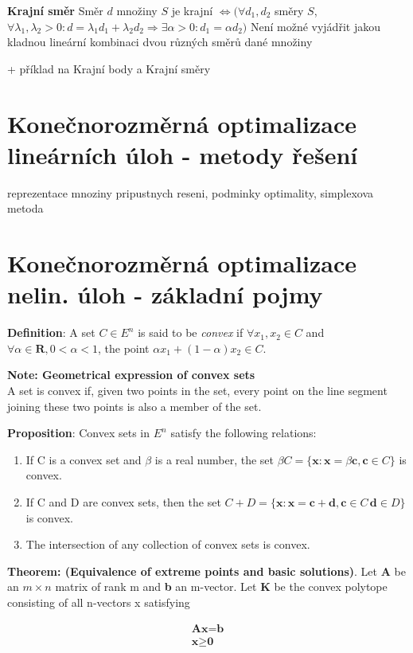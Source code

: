 \textbf{Krajní směr}
Směr $d$ množiny $S$ je krajní $\Leftrightarrow (\forall d_{1},d_{2} $ směry $S$,$ \forall \lambda _{1},\lambda _{2}> 0:d=\lambda _{1}d_{1}+\lambda_{2}d_{2}\Rightarrow \exists \alpha > 0:d_{1}=\alpha d_{2})$
\newline Není možné vyjádřit jakou kladnou lineární kombinaci dvou různých směrů dané množiny


+ příklad na Krajní body a Krajní směry 

\section{Konečnorozměrná optimalizace lineárních úloh - metody řešení}
reprezentace mnoziny pripustnych reseni, podminky optimality, simplexova metoda

\section{Konečnorozměrná optimalizace nelin. úloh - základní pojmy}
\textbf{Definition}: A set $C \in E^{n}$ is said to be \textit{convex} if $\forall x_{1},x_{2} \in C$ and $\forall \alpha \in \mathbf{R}, 0 < \alpha  < 1$, the point $\alpha x_{1} + (1 - \alpha) x_{2} \in C$.

\textbf{Note: Geometrical expression of convex sets} \\
A set is convex if, given two points in the set, every point on the line segment joining these two
points is also a member of the set.

\textbf{Proposition}: Convex sets in $E^{n}$ satisfy the following relations:
\begin{enumerate}
\item If C is a convex set and $\beta$ is a real number, the set
 $\beta C = \{ \textbf{x}: \textbf{x} = \beta \textbf{c}, \textbf{c} \in C\}$
is convex.
\item If C and D are convex sets, then the set
$ C + D = \{ \textbf{x}: \textbf{x} = \textbf{c} + \textbf{d}, \textbf{c} \in C\, \textbf{d} \in D\}$
is convex.
\item The intersection of any collection of convex sets is convex.
\end{enumerate}

\textbf{Theorem: (Equivalence of extreme points and basic solutions)}. Let \textbf{A} be an
$m\times n$ matrix of rank m and \textbf{b} an m-vector. Let \textbf{K} be the convex polytope
consisting of all n-vectors x satisfying

\begin{align*}
\textbf{Ax} = \textbf{b} \\
\textbf{x} \geq \textbf{0}
\end{align*}

